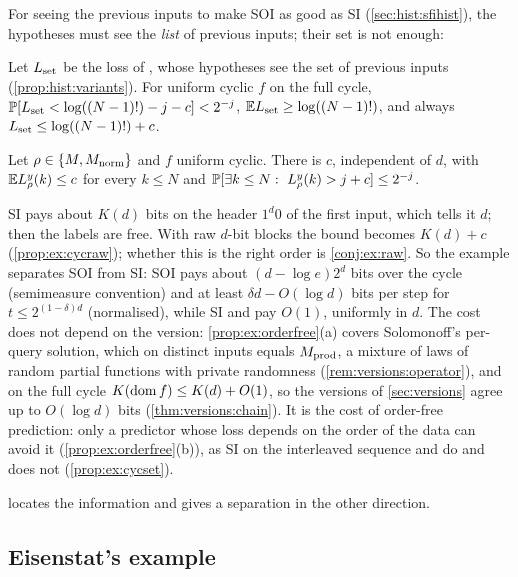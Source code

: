 For seeing the previous inputs to make SOI as good as SI (\cref{sec:hist:sfihist}), the hypotheses must see the \emph{list} of previous inputs; their set is not enough:

\begin{proposition}[\SFIset]\label{prop:ex:cycset}
Let $L_{\rm set}$ be the loss of \SFIset{}, whose hypotheses see the set of previous inputs (\cref{prop:hist:variants}). For uniform cyclic $f$ on the full cycle, $\mathbb{P}[L_{\rm set}<\log((N-1)!)-j-c]<2^{-j}$, $\mathbb{E} L_{\rm set}\ge\log((N-1)!)$, and always $L_{\rm set}\le\log((N-1)!)+c$.
\end{proposition}

\begin{proposition}[SI]\label{prop:ex:cycsi}
Let $\rho\in\{M,M_{\mathrm{norm}}\}$ and $f$ uniform cyclic. There is $c$, independent of $d$, with $\mathbb{E} L^y_\rho(k)\le c$ for every $k\le N$ and $\Prob[\exists k\le N:\ L^y_\rho(k)>j+c]\le2^{-j}$.
\end{proposition}

SI pays about $K(d)$ bits on the header $1^d0$ of the first input, which tells it $d$; then the labels are free. With raw $d$-bit blocks the bound becomes $K(d)+c$ (\cref{prop:ex:cycraw}); whether this is the right order is \cref{conj:ex:raw}. So the example separates SOI from SI: SOI pays about $(d-\log e)2^d$ bits over the cycle (semimeasure convention) and at least $\delta d-O(\log d)$ bits per step for $t\le2^{(1-\delta)d}$ (normalised), while SI and \SFIhist{} pay $O(1)$, uniformly in $d$. The cost does not depend on the version: \cref{prop:ex:orderfree}(a) covers Solomonoff's per-query solution, which on distinct inputs equals $M_{\mathrm{prod}}$, a mixture of laws of random partial functions with private randomness (\cref{rem:versions:operator}), and on the full cycle $K(\operatorname{dom} f)\le K(d)+O(1)$, so the versions of \cref{sec:versions} agree up to $O(\log d)$ bits (\cref{thm:versions:chain}). It is the cost of order-free prediction: only a predictor whose loss depends on the order of the data can avoid it (\cref{prop:ex:orderfree}(b)), as SI on the interleaved sequence and \SFIhist{} do and \SFIset{} does not (\cref{prop:ex:cycset}).

 locates the information and gives a separation in the other direction.

\subsection{Eisenstat's example}\label{sec:ex:eisenstat}


